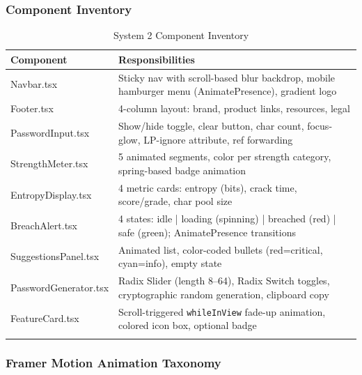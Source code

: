 \documentclass[12pt,a4paper]{article}
\begin{document}
\subsubsection{Component Inventory}

\begin{longtable}{>{\ttfamily}p{4.5cm} p{8.5cm}}
\toprule
\textbf{Component} & \textbf{Responsibilities} \\
\midrule
\endhead

Navbar.tsx          & Sticky nav with scroll-based blur backdrop,
                      mobile hamburger menu (AnimatePresence), gradient logo \\
Footer.tsx          & 4-column layout: brand, product links, resources, legal \\
PasswordInput.tsx   & Show/hide toggle, clear button, char count, focus-glow,
                      LP-ignore attribute, ref forwarding \\
StrengthMeter.tsx   & 5 animated segments, color per strength category,
                      spring-based badge animation \\
EntropyDisplay.tsx  & 4 metric cards: entropy (bits), crack time,
                      score/grade, char pool size \\
BreachAlert.tsx     & 4 states: idle | loading (spinning) | breached (red) |
                      safe (green); AnimatePresence transitions \\
SuggestionsPanel.tsx & Animated list, color-coded bullets (red=critical,
                       cyan=info), empty state \\
PasswordGenerator.tsx & Radix Slider (length 8--64), Radix Switch toggles,
                        cryptographic random generation, clipboard copy \\
FeatureCard.tsx     & Scroll-triggered \texttt{whileInView} fade-up animation,
                      colored icon box, optional badge \\

\bottomrule
\caption{System 2 Component Inventory}
\end{longtable}

\subsubsection{Framer Motion Animation Taxonomy}
\end{document}
